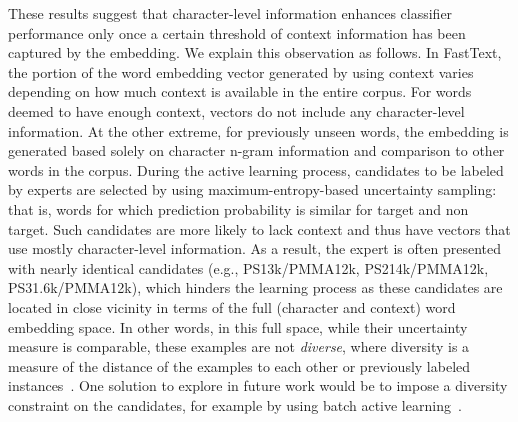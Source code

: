 These results suggest that character-level information enhances classifier performance only once a certain threshold of context information has been captured by the embedding.
We explain this observation as follows. 
In FastText, the portion of the word embedding vector generated by using context varies depending on how much context is available in the entire corpus. 
For words deemed to have enough context, vectors do not include any character-level information. 
At the other extreme, for previously unseen words, the embedding is generated based solely on character n-gram information and comparison to other words in the corpus.
During the active learning process, candidates to be labeled by experts are selected by using maximum-entropy-based uncertainty sampling: that is, words for which prediction probability is similar for target and non target.
Such candidates are more likely to lack context
and thus have vectors that use mostly character-level information.
As a result, the expert is often presented with nearly identical candidates (e.g., PS13k/PMMA12k, PS214k/PMMA12k, PS31.6k/PMMA12k), which hinders the learning process as these candidates are located in close vicinity in terms of the full (character and context) word embedding space.
In other words, in this full space, while their uncertainty measure is comparable, these examples are not \textit{diverse}, where diversity is a measure of the distance of the examples to each other or previously labeled instances~\cite{brinker2003incorporating}.
One solution to explore in future work would be to impose a diversity constraint on the candidates,
for example by using batch active learning~\cite{settles2009active}.


